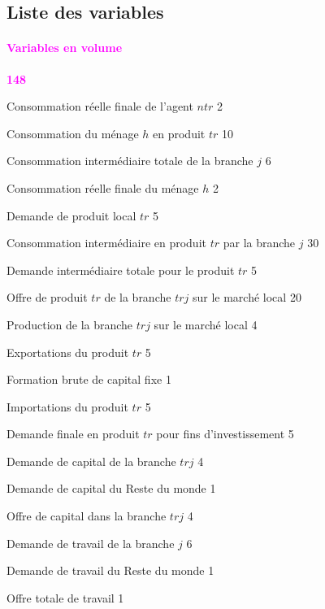 \documentclass[11pt,a4paper]{article}
\newcommand{\trj}{\mathit{trj}}
\newcommand{\CI}{\mathit{CI}}
\newcommand{\CG}{\mathit{CG}}
\newcommand{\CH}{\mathit{CH}}
\newcommand{\CTH}{\mathit{CTH}}
\newcommand{\DD}{\mathit{DD}}
\newcommand{\DX}{\mathit{DX}}
\newcommand{\DI}{\mathit{DI}}
\newcommand{\DIT}{\mathit{DIT}}
\newcommand{\DS}{\mathit{DS}}
\newcommand{\EX}{\mathit{EX}}
\newcommand{\FBCF}{\mathit{FBCF}}
\newcommand{\IM}{\mathit{IM}}
\newcommand{\INV}{\mathit{INV}}
\newcommand{\KD}{\mathit{KD}}
\newcommand{\KS}{\mathit{KS}}
\newcommand{\LD}{\mathit{LD}}
\newcommand{\LS}{\mathit{LS}}
\newcommand{\ntr}{\mathit{ntr}}
\newcommand{\tr}{\mathit{tr}}
\newcommand{\redparagraph}[1]{\paragraph*{\large\textcolor{Fuchsia}{#1}}}
\begin{document}
	\subsection{Liste des variables}
	\redparagraph{Variables en volume}\hfill \textcolor{Fuchsia}{\textbf{148}} 
	\begin{description}[leftmargin=!,labelwidth=\widthof{\bfseries AAAAAAAA},parsep=10pt]
		\item[$\CG_{\ntr}^{\mathit{reel}}$] Consommation réelle finale de l'agent $\ntr$ \hfill 2
		\item[$\CH_{\tr,h}$]	Consommation du ménage $h$ en produit $\tr$ 					\hfill 10
		\item[$\CI_j$]      	Consommation intermédiaire totale de la branche $j$ 			\hfill 6
		\item[$\CTH_h^{\mathit{reel}}$]	Consommation réelle finale du ménage  $h$ 				\hfill 2
		\item[$\DD_{\tr}$]		Demande de produit local $\tr$ 									\hfill 5
		\item[$\DI_{\tr,j}$]	Consommation intermédiaire en produit $\tr$ par la branche $j$ 	\hfill 30
		\item[$\DIT_{\tr}$]		Demande intermédiaire totale pour le produit $\tr$ 				\hfill 5
		\item[$\DS_{\tr,\trj}$]	Offre de produit $\tr$ de la branche $\trj$ sur le marché local \hfill 20
		\item[$\DX_{\trj}$]		Production de la branche $\trj$ sur le marché local 			\hfill 4
		\item[$\EX_{\tr}$]		Exportations du produit $\tr$ 		\hfill 5
		\item[$\FBCF^{\mathit{reel}}$]			Formation brute de capital fixe 	\hfill 1
		\item[$\IM_{\tr}$]		Importations du produit $\tr$ 	\hfill 5
		\item[$\INV_{\tr}$]		Demande finale en produit $\tr$ pour fins d'investissement 	\hfill 5
		\item[$\KD_{\trj}$]		Demande de capital de la branche $\trj$ 		\hfill 4
		\item[$\KD^R$]			Demande de capital du Reste du monde 	\hfill 1
		\item[$\KS_{\trj}$]		Offre de capital dans la branche $\trj$ 		\hfill 4
		\item[$\LD_{j}$]		Demande de travail de la branche $j$ 		\hfill 6
		\item[$\LD^R$]			Demande de travail du Reste du monde 	\hfill 1
		\item[$\LS$]			Offre totale de travail  				\hfill 1

\end{description}
\end{document}
